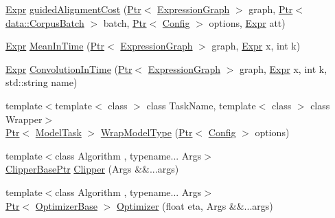 \begin{DoxyCompactItemize}
\item 
\hyperlink{namespacemarian_a498d8baf75b754011078b890b39c8e12}{Expr} \hyperlink{namespacemarian_a1d13d69eb58fd5635225dbfbae4f4292}{guided\+Alignment\+Cost} (\hyperlink{namespacemarian_ad1a373be43a00ef9ce35666145137b08}{Ptr}$<$ \hyperlink{classmarian_1_1ExpressionGraph}{Expression\+Graph} $>$ graph, \hyperlink{namespacemarian_ad1a373be43a00ef9ce35666145137b08}{Ptr}$<$ \hyperlink{classmarian_1_1data_1_1CorpusBatch}{data\+::\+Corpus\+Batch} $>$ batch, \hyperlink{namespacemarian_ad1a373be43a00ef9ce35666145137b08}{Ptr}$<$ \hyperlink{classmarian_1_1Config}{Config} $>$ options, \hyperlink{namespacemarian_a498d8baf75b754011078b890b39c8e12}{Expr} att)
\item 
\hyperlink{namespacemarian_a498d8baf75b754011078b890b39c8e12}{Expr} \hyperlink{namespacemarian_aa26f29df56274ac4295192e4b43c8fac}{Mean\+In\+Time} (\hyperlink{namespacemarian_ad1a373be43a00ef9ce35666145137b08}{Ptr}$<$ \hyperlink{classmarian_1_1ExpressionGraph}{Expression\+Graph} $>$ graph, \hyperlink{namespacemarian_a498d8baf75b754011078b890b39c8e12}{Expr} x, int k)
\item 
\hyperlink{namespacemarian_a498d8baf75b754011078b890b39c8e12}{Expr} \hyperlink{namespacemarian_ae5b4088136fa6f7ebc01aed5a2d65c5c}{Convolution\+In\+Time} (\hyperlink{namespacemarian_ad1a373be43a00ef9ce35666145137b08}{Ptr}$<$ \hyperlink{classmarian_1_1ExpressionGraph}{Expression\+Graph} $>$ graph, \hyperlink{namespacemarian_a498d8baf75b754011078b890b39c8e12}{Expr} x, int k, std\+::string name)
\item 
{\footnotesize template$<$template$<$ class $>$ class Task\+Name, template$<$ class $>$ class Wrapper$>$ }\\\hyperlink{namespacemarian_ad1a373be43a00ef9ce35666145137b08}{Ptr}$<$ \hyperlink{structmarian_1_1ModelTask}{Model\+Task} $>$ \hyperlink{namespacemarian_ac15754f657b81a6e5edbd835b6d6aead}{Wrap\+Model\+Type} (\hyperlink{namespacemarian_ad1a373be43a00ef9ce35666145137b08}{Ptr}$<$ \hyperlink{classmarian_1_1Config}{Config} $>$ options)
\item 
{\footnotesize template$<$class Algorithm , typename... Args$>$ }\\\hyperlink{namespacemarian_ae7082987f4bcf1b02bf5b23e1ebebacb}{Clipper\+Base\+Ptr} \hyperlink{namespacemarian_a991e7dc9706863853c983f2d850e607a}{Clipper} (Args \&\&...args)
\item 
{\footnotesize template$<$class Algorithm , typename... Args$>$ }\\\hyperlink{namespacemarian_ad1a373be43a00ef9ce35666145137b08}{Ptr}$<$ \hyperlink{classmarian_1_1OptimizerBase}{Optimizer\+Base} $>$ \hyperlink{namespacemarian_adcc0fde2e522c9f55abdca1186c9a6db}{Optimizer} (float eta, Args \&\&...args)

\end{DoxyCompactItemize}
